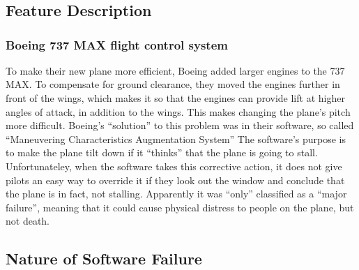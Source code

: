 \documentclass[letterpaper]{article}
\begin{document}
\section{}

\subsection*{Feature Description}
\subsubsection*{Boeing 737 MAX flight control system}
To make their new plane more efficient, Boeing added larger engines to the 737 MAX.
To compensate for ground clearance, they moved the engines further in front of the wings,
which makes it so that the engines can provide lift at higher angles of attack, in addition to the wings.
This makes changing the plane's pitch more difficult. Boeing's ``solution'' to this problem was in their software,
so called “Maneuvering Characteristics Augmentation System”\cite{ieeespectrum}
The software's purpose is to make the plane tilt down if it ``thinks'' that the plane is going to stall.
Unfortunateley, when the software takes this corrective action, it does not give pilots an easy way to override it if
they look out the window and conclude that the plane is in fact, not stalling.
Apparently it was ``only'' classified as a ``major failure'', meaning that it could cause physical distress to people on the plane, but not death.\cite{gates_2019}

\subsection*{Nature of Software Failure}
\end{document}
